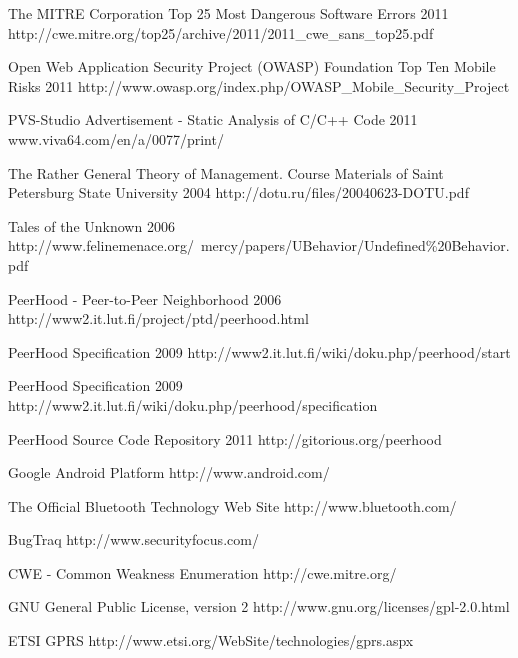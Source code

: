 \begin{thebibliography}{9}
		{The MITRE Corporation}
		{Top 25 Most Dangerous Software Errors}
		{2011}
		{http://cwe.mitre.org/top25/archive/2011/2011_cwe_sans_top25.pdf}
		
		{Open Web Application Security Project (OWASP) Foundation}
		{Top Ten Mobile Risks}
		{2011}
		{http://www.owasp.org/index.php/OWASP_Mobile_Security_Project}
		
		{
			\BibAnd
			}
		{PVS-Studio Advertisement - Static Analysis of C/C++ Code}
		{2011}
		{www.viva64.com/en/a/0077/print/}


		{The Rather General Theory of Management. Course Materials of Saint Petersburg State
			University}
		{2004}
		{http://dotu.ru/files/20040623-DOTU.pdf}

		{Tales of the Unknown}
		{2006}
		{http://www.felinemenace.org/~mercy/papers/UBehavior/Undefined\%20Behavior.pdf}

		{PeerHood - Peer-to-Peer Neighborhood}
		{2006}
		{http://www2.it.lut.fi/project/ptd/peerhood.html}		

		{PeerHood Specification}
		{2009}
		{http://www2.it.lut.fi/wiki/doku.php/peerhood/start}

		{PeerHood Specification}
		{2009}
		{http://www2.it.lut.fi/wiki/doku.php/peerhood/specification}

		{PeerHood Source Code Repository}
		{2011}
		{http://gitorious.org/peerhood}
	

		{Google Android Platform}
		{http://www.android.com/}
	
		{The Official Bluetooth Technology Web Site}
		{http://www.bluetooth.com/}

		{BugTraq}
		{http://www.securityfocus.com/}

		{CWE - Common Weakness Enumeration}
		{http://cwe.mitre.org/}

		{GNU General Public License, version 2}
		{http://www.gnu.org/licenses/gpl-2.0.html}

		{ETSI GPRS}
		{http://www.etsi.org/WebSite/technologies/gprs.aspx}


\end{thebibliography}
